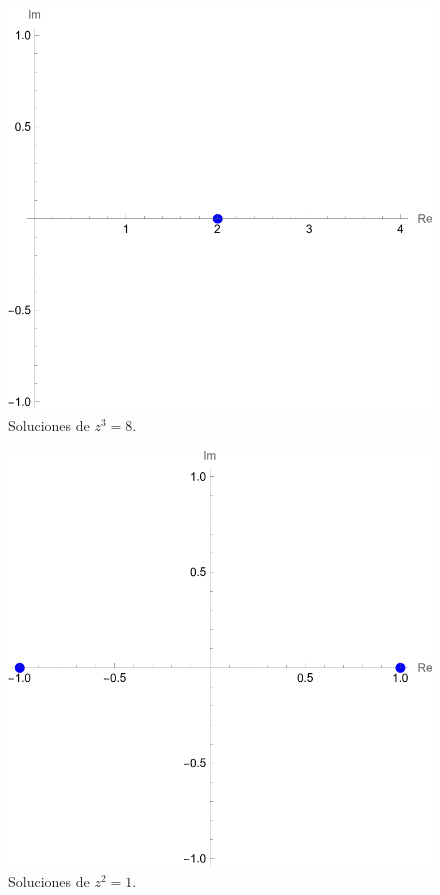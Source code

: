 \documentclass[conference]{IEEEtran}
\begin{document}
\begin{figure}[H]
	\centering
	\includegraphics[scale=0.4]{./img/p14-4_b}
	\caption{Soluciones de $z^3 = 8$.}
\end{figure}


\begin{figure}[H]
	\centering
	\includegraphics[scale=0.4]{./img/p14-4_c}
	\caption{Soluciones de $z^2 = 1$.}
\end{figure}
\end{document}
